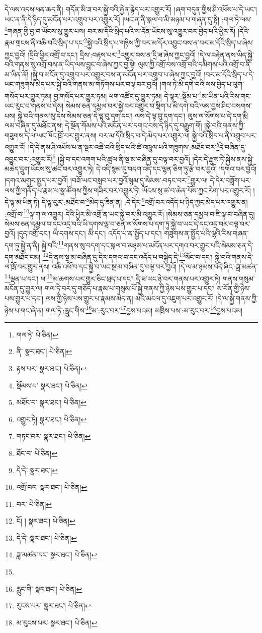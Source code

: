 དེ་ལས་འདས་ཕན་ཆད་ནི། གདོན་མི་ཟ་བར་སྐྱེ་བའི་རྐྱེན་རྙེད་པར་འགྱུར་རོ། །ཞག་བདུན་གྱིས་ཤི་འཕོས་པ་དེ་ཡང་། ཡང་ན་ནི་དེ་ཉིད་དུ་མངོན་པར་འགྲུབ་པར་འགྱུར་རོ། །ཡང་ན་ནི་སྐལ་བ་མི་མཉམ་པ་གཞན་དུ་སྟེ། :གལ་ཏེ་ལས་\footnote{གལ་ཏེ་  པེ་ཅིན། }གཞན་གྱི་བྱ་བ་ཡོངས་སུ་གྱུར་པས། བར་མ་དོའི་སྲིད་པའི་ས་དོན་ཡོངས་སུ་འགྱུར་བར་བྱེད་པའི་ཕྱིར་རོ། །དེའི་རྣམ་གྲངས་ནི་འཆི་བའི་སྲིད་པ་དང་\footnote{ནི་  སྣར་ཐང་།  པེ་ཅིན། }སྐྱེ་བའི་སྲིད་པ་གཉིས་ཀྱི་བར་མ་དོར་འབྱུང་བས་ན་བར་མ་དོའི་སྲིད་པ་ཞེས་ཀྱང་བྱའོ། །དྲིའི་ཕྱིར་འགྲོ་བ་དང་། དྲིས་:བརྟས་པར་\footnote{རྟས་པར་  སྣར་ཐང་།  པེ་ཅིན། }འགྱུར་བས་ན་དྲི་ཟ་ཞེས་ཀྱང་བྱའོ། །དེ་ལ་བརྟེན་ནས་ཡིད་སྐྱེ་བའི་གནས་སུ་འགྲོ་བས་ན་ཡིད་ལས་བྱུང་བ་ཞེས་ཀྱང་བྱ་སྟེ། ལུས་ཀྱི་འགྲོ་བས་འགྲོ་བའི་དམིགས་པའི་འགྲོ་བ་ནི་མ་ཡིན་ནོ། །སྐྱེ་བ་མངོན་དུ་འགྲུབ་པར་འགྱུར་བས་ན་མངོན་པར་འགྲུབ་པ་ཞེས་ཀྱང་བྱའོ། །བར་མ་དོའི་སྲིད་པ་དེ་ཡང་གཟུགས་མེད་པར་སྐྱེ་བའི་གནས་མ་གཏོགས་པར་བལྟ་བར་བྱའོ། །གལ་ཏེ་མི་དགེ་བའི་ལས་བྱེད་པ་ལུག་གསོད་པར་གྱུར་ཏམ། བྱ་གསོད་པར་གྱུར་ཏམ། ཕག་འཚོང་དུ་གྱུར་ཏམ། དེ་ལྟར་:སྡོམ་པ་\footnote{སྡོམས་པ་  སྣར་ཐང་།  པེ་ཅིན། }མ་ཡིན་པའི་རིས་གང་ཡང་རུང་བ་གནས་པ་དེས། སེམས་ཅན་དམྱལ་བར་སྐྱེ་བར་འགྱུར་བ་སྡིག་པ་མི་དགེ་བའི་ལས་བྱས་ཤིང་བསགས་པས། སྐྱེ་བའི་གནས་སུ་དེས་སེམས་ཅན་དེ་ལྟ་བུ་དག་དང་། ལས་དེ་ལྟ་བུ་དག་དང་། ལུས་ལ་སོགས་པ་དེ་དག་རྨི་ལམ་བཞིན་དུ་མཐོང་ནས། དེ་སྔོན་གོམས་པའི་མངོན་པར་དགའ་བས་དེ་ཉིད་དུ་བརྒྱུག་གོ། །སྐྱེ་བའི་གནས་ཀྱི་གཟུགས་དེ་ལ་ཡང་ཁོང་ཁྲོ་བར་གྱུར་ནས། བར་མ་དོའི་སྲིད་པ་དེ་མེད་པར་འགྱུར་ལ། སྐྱེ་བའི་སྲིད་པ་ནི་འགྲུབ་པར་འགྱུར་རོ། །དེ་དེ་ནས་ཤི་འཕོས་པ་ན་སྔར་འཆི་བའི་སྲིད་པའི་ཚེ་འཁྲུལ་པའི་གཟུགས་:མཐོང་བར་\footnote{མཐོང་བ་  སྣར་ཐང་།  པེ་ཅིན། }དེ་བཞིན་དུ་འབྱུང་བར་:འགྱུར་རོ།\footnote{འགྱུར་ཏེ།  སྣར་ཐང་།  པེ་ཅིན། } །སྐྱེ་བ་དང་འགག་པའི་ཚུལ་ནི་སྔ་མ་བཞིན་དུ་བལྟ་བར་བྱའོ། །དེར་དེ་རྫུས་ཏེ་སྐྱེས་ནས་སྐྱེ་མཆེད་དྲུག་ཡོངས་སུ་ཚང་བར་འགྱུར་ཏེ། དེ་འདི་སྙམ་དུ་བདག་འདི་དང་ལྷན་ཅིག་ཏུ་རྩེ་བར་བྱའོ། །དགའ་བར་བྱའོ། །དགའ་མགུར་སྤྱད་པར་བྱའོ། །བཟོ་ཡང་བསླབ་པར་བྱའོ་སྙམ་དུ་སེམས་:བཏང་བར་\footnote{གཏང་བར་  སྣར་ཐང་།  པེ་ཅིན། }གྱུར་ལ། དེ་དེར་བཟློག་པར་ལས་ཀྱི་གནོད་པ་རྣམ་པ་སྣ་ཚོགས་ཀྱིས་གཟིར་བར་འགྱུར་ཏེ། ཡོངས་སུ་ཚ་བ་ཆེན་པོས་ཀྱང་རེག་པར་འགྱུར་རོ། །དེ་ལྟ་མ་ཡིན་ཏེ། དེ་ལྟ་བུར་:མཐོང་བ་\footnote{ཐོང་བ་  པེ་ཅིན། }མེད་དུ་ཟིན་ན། :དེ་དེར་\footnote{དེ་དེ་  སྣར་ཐང་། }འགྲོ་བར་འདོད་པ་ཉིད་ཀྱང་མེད་པར་འགྱུར་ན། :འགྲོ་བ་\footnote{འགྲོ་བར་  སྣར་ཐང་།  པེ་ཅིན། }ལྟ་ག་ལ་འགྱུར། དེའི་ཕྱིར་མི་འགྲོ་ན་ཡང་སྐྱེ་བར་མི་འགྱུར་རོ། །སེམས་ཅན་དམྱལ་བ་ཇི་ལྟ་བ་བཞིན་དུ། སེམས་ཅན་དམྱལ་བ་དང་འདྲ་བའི་ཡི་དགས་ལྦ་བ་ཅན་ལ་སོགས་པ་དག་ཏུ་སྐྱེ་བ་ཡང་དེ་དང་འདྲ་བར་བལྟ་བར་བྱའོ། །དུད་འགྲོ་དང་། ཡི་དགས་དང་། མི་དང་། འདོད་པ་ན་སྤྱོད་པ་དང་། གཟུགས་ན་སྤྱོད་པའི་ལྷའི་རིས་གཞན་དག་ཏུ་སྐྱེ་ན་ནི། སྐྱེ་བའི་\footnote{བར་  པེ་ཅིན། }གནས་སུ་བདག་དང་སྐལ་བ་མཉམ་པ་མངོན་པར་དགའ་བར་གྱུར་པའི་སེམས་ཅན་དེ་དག་མཐོང་ངམ། \footnote{ངོ། །   སྣར་ཐང་།  པེ་ཅིན། }དེ་ནས་སྔ་མ་བཞིན་དུ་དེར་དགའ་བ་དང་འདོད་པ་བསྐྱེད་དེ་\footnote{དེ་དེ་  སྣར་ཐང་།  པེ་ཅིན། }སོང་བ་དང་། སྐྱེ་བའི་གནས་དེ་ལ་ཁྲོ་བར་གྱུར་ནས། འཆི་འཕོ་བ་དང་སྐྱེ་བ་ཡང་སྔ་མ་བཞིན་དུ་བལྟ་བར་བྱའོ། །དེ་ལ་མ་ཉམས་བདེ་ཞིང་:ཟླ་མཚན་\footnote{ཟླ་མཚན་དང་  སྣར་ཐང་།  པེ་ཅིན། }ལྡན་པ་དང་། ཕ་\footnote{}མ་ཆགས་པར་གྱུར་ཅིང་ཕྲད་པ་དང་། དྲི་ཟ་ཡང་ཉེ་བར་གནས་པར་འགྱུར་ཏེ། གནས་གསུམ་མངོན་དུ་གྱུར་ལ། གལ་ཏེ་བར་དུ་གཅོད་པ་རྣམ་པ་གསུམ་པོ་སྐྱེ་གནས་ཀྱི་ཉེས་པས་གྱུར་པ་དང་། ས་བོན་གྱི་ཉེས་པས་གྱུར་པ་དང་། ལས་ཀྱི་ཉེས་པས་གྱུར་པ་རྣམས་མེད་ན། མའི་མངལ་དུ་འཇུག་པར་འགྱུར་རོ། །དེ་ལ་སྐྱེ་གནས་ཀྱི་ཉེས་པ་གང་ཞེ་ན། གལ་ཏེ་:རླུང་གིས་\footnote{རླུང་གི་  སྣར་ཐང་།  པེ་ཅིན། }མ་:རུང་བར་\footnote{རུངས་པར་  སྣར་ཐང་།  པེ་ཅིན། }བྱས་པའམ། མཁྲིས་པས་:མ་རུང་བར་\footnote{མ་རུངས་པར་  སྣར་ཐང་།  པེ་ཅིན། }བྱས་པའམ། 